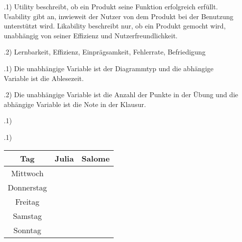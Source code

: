 \documentclass[12pt]{scrartcl}
\begin{document}
\exercise{}
    \begin{itemize}
        \item[\theenumi.1)]
            Utility beschreibt, ob ein Produkt seine Funktion erfolgreich erfüllt.
            Usability gibt an, inwieweit der Nutzer von dem Produkt bei der Benutzung unterstützt wird.
            Likability beschreibt nur, ob ein Produkt gemocht wird, unabhängig von seiner Effizienz und Nutzerfreundlichkeit.
        \item[\theenumi.2)]Lernbarkeit, Effizienz, Einprägsamkeit, Fehlerrate, Befriedigung 
    \end{itemize}

\setcounter{enumi}{4}
\exercise{}
\begin{itemize}
    \item[\theenumi.1)] Die unabhängige Variable ist der Diagrammtyp und die abhängige Variable ist die Ablesezeit.
    \item[\theenumi.2)] Die unabhängige Variable ist die Anzahl der Punkte in der Übung und die abhängige Variable ist die Note in der Klausur.
\end{itemize}

\exercise{}

\begin{itemize}
    \item[\theenumi.1)]
\end{itemize}

\exercise{}
\begin{itemize}
    \item[\theenumi.1)] \, \\
        \begin{tabular}{c c c}
            Tag & Julia & Salome\\ \hline
            Mittwoch & & \\ \hline
            Donnerstag & & \\ \hline
            Freitag & & \\ \hline
            Samstag & & \\ \hline
            Sonntag & & \\ \hline
        \end{tabular}
\end{itemize}
        
\end{document}
